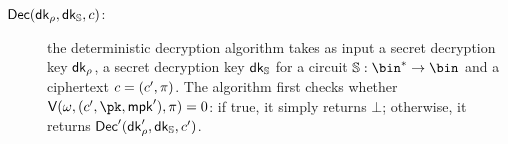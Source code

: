 \begin{construction}
\begin{description}
        \item[$\mathsf{Dec}(\mathsf{dk}_\rho, \mathsf{dk}_{\mathbb{S}}, c)$:] the deterministic decryption algorithm takes as input a secret decryption key $\mathsf{dk}_\rho$, a secret decryption key $\mathsf{dk}_{\mathbb{S}}$ for a circuit $\saccess: \bin^* \to \bin$ and a ciphertext $c = (c', \pi)$. The algorithm first checks whether $\verifier(\crs, (\cipher', \pk, \mpk'), \pi) = 0$: if true, it simply returns $\bot$; otherwise, it returns $\mathsf{Dec}'(\mathsf{dk}'_\rho, \mathsf{dk}_{\mathbb{S}}, c')$.
    \end{description}
\end{construction}